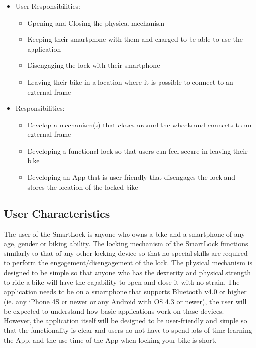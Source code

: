 \documentclass[12pt]{article}
\begin{document}
\begin{itemize}
\item User Responsibilities:
\begin{itemize}
\item Opening and Closing the physical mechanism
\item Keeping their smartphone with them and charged to be able to use the application
\item Disengaging the lock with their smartphone
\item Leaving their bike in a location where it is possible to connect to an external frame
\end{itemize}
\item \progname{} Responsibilities:
\begin{itemize}
\item Develop a mechanism(s) that closes around the wheels and connects to an external frame
\item Developing a functional lock so that users can feel secure in leaving their bike
\item Developing an App that is user-friendly that disengages the lock and stores the location of the locked bike
\end{itemize}
\end{itemize}

\subsection{User Characteristics} \label{SecUserCharacteristics}


The user of the SmartLock is anyone who owns a bike and a smartphone of any age, gender or biking ability.  The locking mechanism of the SmartLock functions similarly to that of any other locking device so that no special skills are required to perform the engagement/disengagement of the lock.  The physical mechanism is designed to be simple so that anyone who has the dexterity and physical strength to ride a bike will have the capability to open and close it with no strain.  The application needs to be on a smartphone that supports Bluetooth v4.0 or higher (ie. any iPhone 4S or newer or any Android with OS 4.3 or newer), the user will be expected to understand how basic applications work on these devices.  However, the application itself will be designed to be user-friendly and simple so that the functionality is clear and users do not have to spend lots of time learning the App, and the use time of the App when locking your bike is short. 
\end{document}
